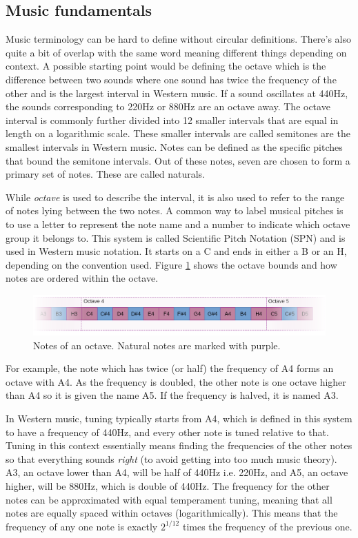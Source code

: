\subsection{Music fundamentals} 
Music terminology can be hard to define without circular definitions. There's also quite a bit of overlap with the same word meaning different things depending on context. A possible starting point would be defining the octave which is the difference between two sounds where one sound has twice the frequency of the other and is the largest interval in Western music. If a sound oscillates at 440Hz, the sounds corresponding to 220Hz or 880Hz are an octave away. The octave interval is commonly further divided into 12 smaller intervals that are equal in length on a logarithmic scale. These smaller intervals are called semitones are the smallest intervals in Western music. Notes can be defined as the specific pitches that bound the semitone intervals. Out of these notes, seven are chosen to form a primary set of notes. These are called naturals. 

While \textit{octave} is used to describe the interval, it is also used to refer to the range of notes lying between the two notes. A common way to label musical pitches is to use a letter to represent the note name and a number to indicate which octave group it belongs to. This system is called Scientific Pitch Notation (SPN) and is used in Western music notation. It starts on a C and ends in either a B or an H, depending on the convention used. Figure \ref{fig:noteScale} shows the octave bounds and how notes are ordered within the octave.

\begin{figure}[ht]
    \centering
    \includegraphics[width=\textwidth]{./images/noteScale.png}
    \caption{Notes of an octave. Natural notes are marked with purple. \label{fig:noteScale}}
\end{figure}

For example, the note which has twice (or half) the frequency of A4 forms an octave with A4. As the frequency is doubled, the other note is one octave higher than A4 so it is given the name A5. If the frequency is halved, it is named A3. 

In Western music, tuning typically starts from A4, which is defined in this system to have a frequency of 440Hz, and every other note is tuned relative to that. Tuning in this context essentially means finding the frequencies of the other notes so that everything sounds \textit{right} (to avoid getting into too much music theory). A3, an octave lower than A4, will be half of 440Hz i.e. 220Hz, and A5, an octave higher, will be 880Hz, which is double of 440Hz. The frequency for the other notes can be approximated with equal temperament tuning, meaning that all notes are equally spaced within octaves (logarithmically). This means that the frequency of any one note is exactly $2^{1/12}$ times the frequency of the previous one.  

